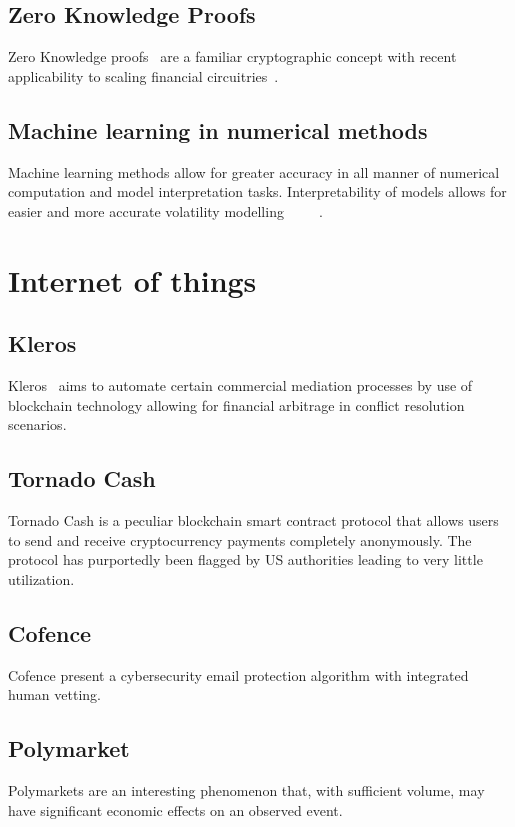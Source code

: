 \documentclass[11pt]{article}
\begin{document}
\subsection{Zero Knowledge Proofs}
Zero Knowledge proofs~\cite{ernstberger_2024_do} are a familiar cryptographic concept with recent applicability to scaling financial circuitries~\cite{leethorp_2022_fnet}.
\subsection{Machine learning in numerical methods}
Machine learning methods allow for greater accuracy in all manner of numerical computation and model interpretation tasks. Interpretability of models allows for easier and more accurate volatility modelling~\cite{beck_2019_machine}~\cite{kirenz_2022_using}~\cite{parr_2021_partial}~\cite{yuan_2024_deep}~\cite{briciu_2024_estimating}.


\section{Internet of things}
\subsection{Kleros~\cite{zhuk_2023_applying}}
Kleros~\cite{zhuk_2023_applying} aims to automate certain commercial mediation processes by use of blockchain technology allowing for financial arbitrage in conflict resolution scenarios.
\subsection{Tornado Cash~\cite{nadler_2023_tornado}~\cite{pertsev_2019_tornado}}
Tornado Cash is a peculiar blockchain smart contract protocol that allows users to send and receive cryptocurrency payments completely anonymously. The protocol has purportedly been flagged by US authorities leading to very little utilization.
\subsection{Cofence~\cite{cofense_2024_phishme}}
Cofence present a cybersecurity email protection algorithm with integrated human vetting.
\subsection{Polymarket~\cite{polymarket}}
Polymarkets are an interesting phenomenon that, with sufficient volume, may have significant economic effects on an observed event.
\end{document}
